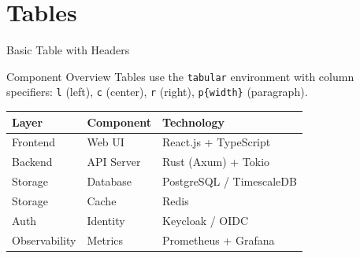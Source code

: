 \section{Tables}

\begin{frame}{Basic Table with Headers}
  \begin{block}{Component Overview}
    \scriptsize
    Tables use the \texttt{tabular} environment with column specifiers:
    \texttt{l} (left), \texttt{c} (center), \texttt{r} (right), \texttt{p\{width\}} (paragraph).
  \end{block}

  \vspace{0.2cm}

  \begin{center}
    \scriptsize
    \begin{tabular}{|l|l|p{5cm}|}
      \hline
      \textbf{Layer} & \textbf{Component} & \textbf{Technology} \\
      \hline
      \hline
      Frontend & Web UI & React.js + TypeScript \\
      \hline
      Backend & API Server & Rust (Axum) + Tokio \\
      \hline
      Storage & Database & PostgreSQL / TimescaleDB \\
      \hline
      Storage & Cache & Redis \\
      \hline
      Auth & Identity & Keycloak / OIDC \\
      \hline
      Observability & Metrics & Prometheus + Grafana \\
      \hline
    \end{tabular}
  \end{center}
\end{frame}

